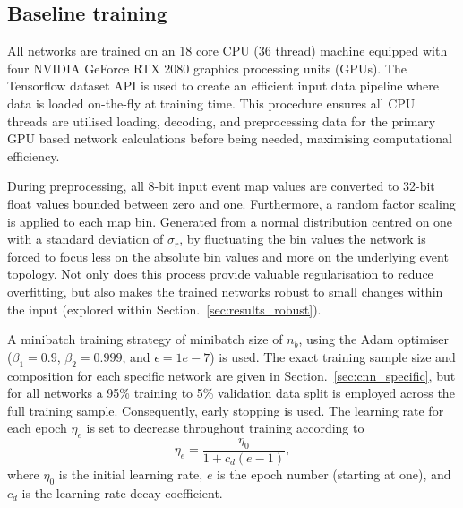 \subsection{Baseline training} %
\label{sec:cnn_baseline_training} %

All networks are trained on an 18 core CPU (36 thread) machine equipped with four NVIDIA GeForce
RTX 2080 graphics processing units (GPUs). The Tensorflow dataset API is used to create an
efficient input data pipeline where data is loaded on-the-fly at training time. This procedure
ensures all CPU threads are utilised loading, decoding, and preprocessing data for the primary GPU
based network calculations before being needed, maximising computational efficiency.

During preprocessing, all 8-bit input event map values are converted to 32-bit float values
bounded between zero and one. Furthermore, a random factor scaling is applied to each map bin.
Generated from a normal distribution centred on one with a standard deviation of $\sigma_{r}$, by
fluctuating the bin values the network is forced to focus less on the absolute bin values and more
on the underlying event topology. Not only does this process provide valuable regularisation to
reduce overfitting, but also makes the trained networks robust to small changes within the input
(explored within Section.~\ref{sec:results_robust}).

A minibatch training strategy of minibatch size of $n_{b}$, using the Adam
optimiser~\cite{kingma2014} ($\beta_{1}=0.9$, $\beta_{2}=0.999$, and $\epsilon = 1e-7$) is used.
The exact training sample size and composition for each specific network are given in
Section.~\ref{sec:cnn_specific}, but for all networks a 95\% training to 5\% validation data split
is employed across the full training sample. Consequently, early stopping is used. The learning
rate for each epoch $\eta_{e}$ is set to decrease throughout training according to
\begin{equation}
    \eta_{e}=\frac{\eta_{0}}{1+c_{d}(e-1)},
\end{equation}
where $\eta_{0}$ is the initial learning rate, $e$ is the epoch number (starting at one), and
$c_{d}$ is the learning rate decay coefficient.

